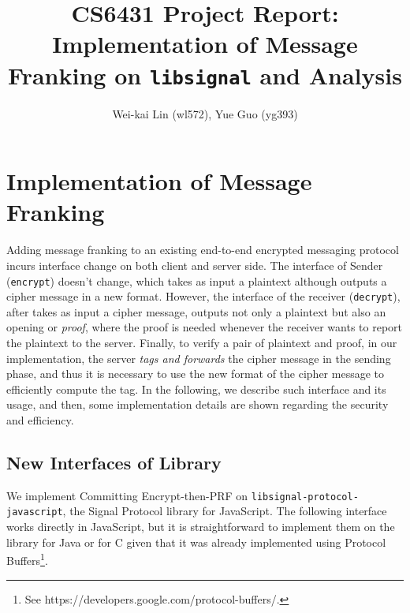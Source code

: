 \documentclass{article}
\title{CS6431 Project Report: Implementation of Message Franking on \texttt{libsignal} and Analysis}
\author{Wei-kai Lin (wl572), Yue Guo (yg393)}
\newcommand{\weikai}[1]{\textcolor{blue}{[weikai: #1]}}
\begin{document}
\maketitle

\begin{abstract}
    
\end{abstract}






\section{Implementation of Message Franking}

Adding message franking to an existing end-to-end encrypted
messaging protocol incurs interface change on both client and server side.
The interface of Sender ({\tt encrypt}) doesn't change,
which takes as input a plaintext
although outputs a cipher message in a new format.
However, the interface of the receiver ({\tt decrypt}),
after takes as input a cipher message,
outputs not only a plaintext but also an opening or \emph{proof},
where the proof is needed 
whenever the receiver wants to report the plaintext to the server.
Finally, to verify a pair of plaintext and proof,
in our implementation,
the server \emph{tags and forwards} the cipher message in the sending phase,
and thus it is necessary to use the new format of the cipher message
to efficiently compute the tag.
In the following, we describe such interface and its usage,
and then, some implementation details are shown 
regarding the security and efficiency.

\subsection{New Interfaces of Library}

We implement Committing Encrypt-then-PRF on {\tt libsignal-protocol-javascript},
the Signal Protocol library for JavaScript.
The following interface works directly in JavaScript,
but it is straightforward to 
implement them on the library for Java or for C
given that it was already implemented using Protocol Buffers\footnote{
See https://developers.google.com/protocol-buffers/.
}.
\end{document}
